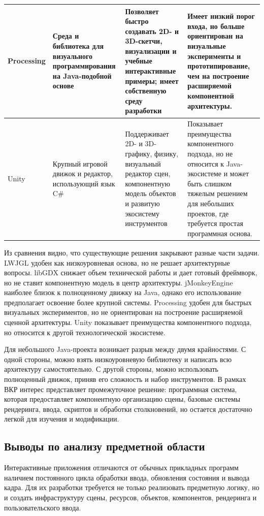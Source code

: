 \begin{longtable}{|
>{\raggedright\arraybackslash}p{}|
>{\raggedright\arraybackslash}p{}|
>{\raggedright\arraybackslash}p{}|
>{\raggedright\arraybackslash}p{}|}
Processing &
Среда и библиотека для визуального программирования на Java-подобной основе &
Позволяет быстро создавать 2D- и 3D-скетчи, визуализации и учебные интерактивные примеры; имеет собственную среду разработки &
Имеет низкий порог входа, но больше ориентирован на визуальные эксперименты и прототипирование, чем на построение расширяемой компонентной архитектуры. \\ \hline

Unity &
Крупный игровой движок и редактор, использующий язык C\# &
Поддерживает 2D- и 3D-графику, физику, визуальный редактор сцен, компонентную модель объектов и развитую экосистему инструментов &
Показывает преимущества компонентного подхода, но не относится к Java-экосистеме и может быть слишком тяжелым решением для небольших проектов, где требуется простая программная основа. \\ \hline

\end{longtable}

\endgroup

Из сравнения видно, что существующие решения закрывают разные части
задачи. LWJGL удобен как низкоуровневая основа, но не решает архитектурные
вопросы. libGDX снижает объем технической работы и дает готовый фреймворк,
но не ставит компонентную модель в центр архитектуры. jMonkeyEngine
наиболее близок к полноценному движку на Java, однако его использование
предполагает освоение более крупной системы. Processing удобен для быстрых
визуальных экспериментов, но не ориентирован на построение расширяемой
сценной архитектуры. Unity показывает преимущества компонентного подхода,
но относится к другой технологической экосистеме.

Для небольшого Java-проекта возникает разрыв между двумя крайностями.
С одной стороны, можно взять низкоуровневую библиотеку и написать всю
архитектуру самостоятельно. С другой стороны, можно использовать
полноценный движок, приняв его сложность и набор инструментов. В рамках
ВКР интерес представляет промежуточное решение: программная система,
которая предоставляет компонентную организацию сцены, базовые системы
рендеринга, ввода, скриптов и обработки столкновений, но остается
достаточно легкой для изучения и модификации.

\subsection{Выводы по анализу предметной области}

Интерактивные приложения отличаются от обычных прикладных программ
наличием постоянного цикла обработки ввода, обновления состояния и вывода
кадра. Для их разработки требуется не только реализовать предметную логику,
но и создать инфраструктуру сцены, ресурсов, объектов, компонентов,
рендеринга и пользовательского ввода.

